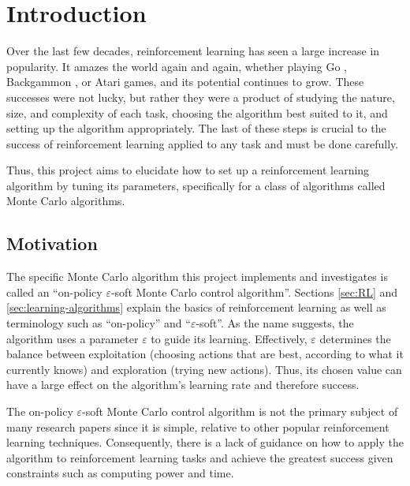 \documentclass[11pt,a4paper,twoside,openright]{report}
\begin{document}
\tableofcontents


\cleardoublepage
{}
\newpage

\chapter{Introduction}

Over the last few decades, reinforcement learning has seen a large increase in popularity. It amazes the world again and again, whether playing Go \cite{go}, Backgammon \cite{backgammon}, or Atari \cite{atari} games, and its potential continues to grow. These successes were not lucky, but rather they were a product of studying the nature, size, and complexity of each task, choosing the algorithm best suited to it, and setting up the algorithm appropriately. The last of these steps is crucial to the success of reinforcement learning applied to any task and must be done carefully.

Thus, this project aims to elucidate how to set up a reinforcement learning algorithm by tuning its parameters, specifically for a class of algorithms called Monte Carlo algorithms.


\section{Motivation}

The specific Monte Carlo algorithm this project implements and investigates is called an ``on-policy $\varepsilon$-soft Monte Carlo control algorithm''. Sections \ref{sec:RL} and \ref{sec:learning-algorithms} explain the basics of reinforcement learning as well as terminology such as ``on-policy'' and ``$\varepsilon$-soft''. As the name suggests, the algorithm uses a parameter $\varepsilon$ to guide its learning. Effectively, $\varepsilon$ determines the balance between exploitation (choosing actions that are best, according to what it currently knows) and exploration (trying new actions). Thus, its chosen value can have a large effect on the algorithm's learning rate and therefore success.

The on-policy $\varepsilon$-soft Monte Carlo control algorithm is not the primary subject of many research papers since it is simple, relative to other popular reinforcement learning techniques. Consequently, there is a lack of guidance on how to apply the algorithm to reinforcement learning tasks and achieve the greatest success given constraints such as computing power and time.
\end{document}
